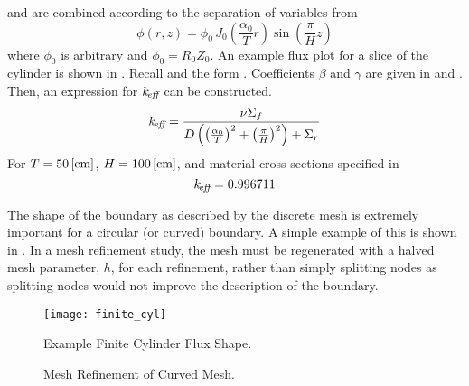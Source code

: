    and  are combined according to
  the separation of variables from 
  \begin{equation}
    \label{eq:analytic_finite_cyl}
    \phi(r,z) = \phi_0 \, 
      J_0\left(\frac{\alpha_0}{T} r\right) \sin\left(\frac{\pi}{H} z \right)
  \end{equation}
  where $\phi_0$ is arbitrary and $\phi_0 = R_0 Z_0$.
  An example flux plot for a slice of the cylinder is shown in 
  . Recall  and the form 
  . Coefficients $\beta$ and $\gamma$ are given in 
   and . Then, an expression
  for $k_{\!\mbox{\scriptsize \em eff}}$ can be constructed.
  \begin{equation}
    \label{eq:keff_finite_cyl}
    k_{\!\mbox{\scriptsize \em eff}} = \frac{\nu \Sigma_f}{D \left( \left(\frac{\alpha_0}{T}\right)^2 +
    \left( \frac{\pi}{H}\right)^2 \right) + \Sigma_r}
  \end{equation}
  For $T = 50 \left[\text{{cm}}\right]$, $H = 100 \left[\text{{cm}}\right]$, and material cross sections
  specified in 
  \begin{equation}
    k_{\!\mbox{\scriptsize \em eff}} = 0.996711
  \end{equation}
  
  The shape of the boundary as described by the discrete mesh is extremely 
  important for a circular (or curved) boundary. A simple example of this is 
  shown in . In a mesh refinement study, the mesh must 
  be regenerated with a halved mesh parameter, $h$, for each refinement, rather 
  than simply splitting nodes as splitting nodes would not improve the 
  description of the boundary.

  \begin{figure}
    \centering
    \texttt{[image: finite\_cyl]}
    \caption{Example Finite Cylinder Flux Shape.}
    \label{fig:finite_cyl}
  \end{figure}

  \begin{figure}
    \centering
    \vspace{0.2in}
    \caption{Mesh Refinement of Curved Mesh.}
    \label{fig:circle_meshes}
  \end{figure}

